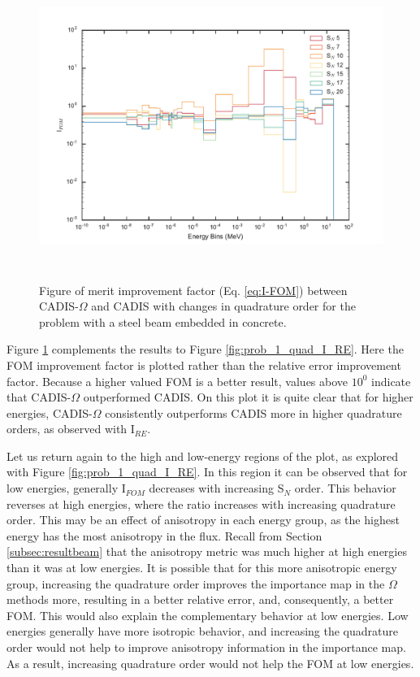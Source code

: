 \begin{figure}[h!]
  \centering
  \includegraphics[height=10cm]{./chapters/characterization_probs/figures/angle/prob_1/compare_fom_quad.pdf}
  \caption[Figure of merit improvement factor  (Eq. \eqref{eq:I-FOM}) between CADIS-$\Omega$ and
  CADIS with changes in quadrature order for steel beam embedded in concrete.]
  {Figure of merit improvement factor  (Eq. \eqref{eq:I-FOM}) between CADIS-$\Omega$ and
   CADIS with changes in quadrature order for the problem with
   a steel beam embedded in concrete.}
  \label{fig:prob_1_quad_I_FOM}
\end{figure}

Figure \ref{fig:prob_1_quad_I_FOM} complements the results to Figure
\ref{fig:prob_1_quad_I_RE}. Here the FOM improvement factor is plotted rather
than the relative error improvement factor. Because a higher valued FOM is a
better result, values above $10^{0}$ indicate that CADIS-$\Omega$ outperformed
CADIS. On this plot it is quite clear that for higher energies, CADIS-$\Omega$
consistently outperforms CADIS more
in higher quadrature orders, as observed with I$_{RE}$.

Let us return again to the high and low-energy regions of the plot, as explored
with Figure \ref{fig:prob_1_quad_I_RE}. In this region it can be observed
that for low energies, generally I$_{FOM}$ decreases with increasing
S$_{N}$ order. This behavior reverses at high energies, where the ratio
increases with increasing quadrature order. This may be an effect of anisotropy
in each energy group, as the highest energy has the most anisotropy in the flux.
Recall from Section \ref{subsec:resultbeam} that the anisotropy metric was much
higher at high energies than it was at low energies. It is possible that for
this more anisotropic energy group, increasing the quadrature order improves the
importance map in the $\Omega$ methods more, resulting in a better relative
error, and, consequently, a better FOM.
This would also explain the complementary behavior at low energies. Low
energies generally have more isotropic behavior, and increasing the quadrature
order would not help to improve anisotropy information in the importance map.
As a result, increasing quadrature order would not help the FOM at low energies.


